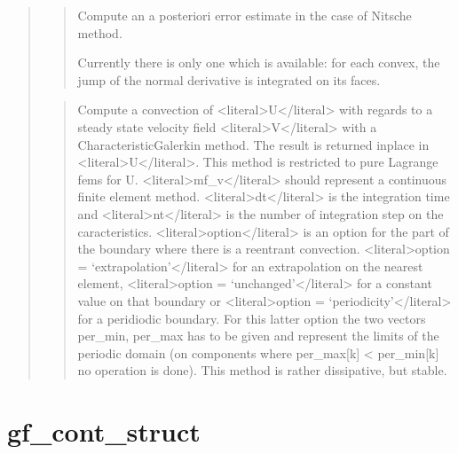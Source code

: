 \documentclass[a4paper,11pt,english]{sphinxmanual}
\begin{document}
\begin{quote}
\begin{quote}
\sphinxAtStartPar
Compute an a posteriori error estimate in the case of Nitsche method.

\sphinxAtStartPar
Currently there is only one which is available: for each convex,
the jump of the normal derivative is integrated on its faces.
\end{quote}

\sphinxAtStartPar
{}
\begin{quote}

\sphinxAtStartPar
Compute a convection of \textless{}literal\textgreater{}U\textless{}/literal\textgreater{} with regards to a steady state velocity
field \textless{}literal\textgreater{}V\textless{}/literal\textgreater{} with a Characteristic\sphinxhyphen{}Galerkin method. The result is returned
in\sphinxhyphen{}place in \textless{}literal\textgreater{}U\textless{}/literal\textgreater{}.
This method is restricted to pure Lagrange fems for U. \textless{}literal\textgreater{}mf\_v\textless{}/literal\textgreater{} should
represent a continuous finite element method. \textless{}literal\textgreater{}dt\textless{}/literal\textgreater{} is the integration time
and \textless{}literal\textgreater{}nt\textless{}/literal\textgreater{} is the number of integration step on the caracteristics. \textless{}literal\textgreater{}option\textless{}/literal\textgreater{}
is an option for the part of the boundary where there is a re\sphinxhyphen{}entrant
convection.
\textless{}literal\textgreater{}option = ‘extrapolation’\textless{}/literal\textgreater{} for an extrapolation on the nearest element,
\textless{}literal\textgreater{}option = ‘unchanged’\textless{}/literal\textgreater{} for a constant value on that boundary or
\textless{}literal\textgreater{}option = ‘periodicity’\textless{}/literal\textgreater{} for a peridiodic boundary. For this latter option
the two vectors per\_min, per\_max has to be given and represent the limits
of the periodic domain (on components where per\_max{[}k{]} \textless{} per\_min{[}k{]}
no operation is done).
This method is rather dissipative, but stable.
\end{quote}
\end{quote}


\section{gf\_cont\_struct}
\label{\detokenize{scilab/cmdref_gf_cont_struct:gf-cont-struct}}\label{\detokenize{scilab/cmdref_gf_cont_struct::doc}}
\sphinxAtStartPar
{}
\end{document}
